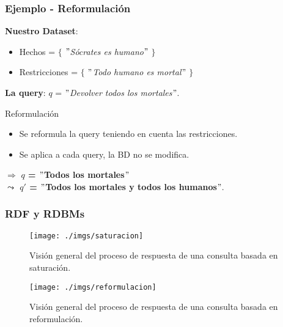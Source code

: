\documentclass{beamer}
\begin{document}
\begin{frame}
\frametitle{Ejemplo - Reformulación}

\textbf{Nuestro Dataset}:
\begin{itemize}
\item Hechos = $\lbrace$ \textit{$"$Sócrates es humano$"$} $\rbrace$
\item Restricciones = $\lbrace$ \textit{$"$Todo humano es mortal$"$} $\rbrace$
\end{itemize}

\vspace{1 mm}

\textbf{La query}: $q$ = \textit{$"$Devolver todos los mortales$"$}.

\vspace{7 mm}

\begin{exampleblock}{Reformulación}

\begin{itemize}
\item Se reformula la query teniendo en cuenta las restricciones.
\item Se aplica a cada query, la BD no se modifica.
\end{itemize}
\hspace{1cm} $\Rightarrow$ \textbf{$q$ = $"$Todos los mortales$"$} \\
\hspace{1.8cm} \textbf{$\leadsto$ $q'$ = $"$Todos los mortales y todos los humanos$"$}.

\end{exampleblock}

\end{frame}



\begin{frame}
\frametitle{RDF y RDBMs}

\begin{figure}[h]
\begin{center}
\texttt{[image: ./imgs/saturacion]}
\caption{Visión general del proceso de respuesta de una consulta basada en saturación.}
\end{center}
\end{figure}

\begin{figure}[H]
\begin{center}
\texttt{[image: ./imgs/reformulacion]}
\caption{Visión general del proceso de respuesta de una consulta basada en reformulación.}
\end{center}
\end{figure}
\end{frame}
\end{document}

